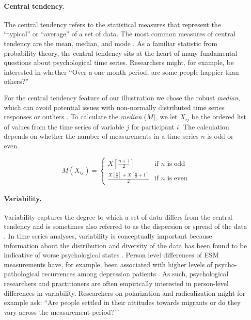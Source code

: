 \paragraph{Central tendency.}

The central tendency refers to the statistical measures that represent
the ``typical'' or ``average'' of a set of data. The most common
measures of central tendency are the mean, median, and mode
\citep{weisberg1992}. As a familiar statistic from probability theory,
the central tendency sits at the heart of many fundamental questions
about psychological time series. Researchers might, for example, be
interested in whether ``Over a one month period, are some people happier
than others?''

For the central tendency feature of our illustration we chose the robust
\textit{median}, which can avoid potential issues with non-normally
distributed time series responses or outliers \citep{weisberg1992}. To
calculate the \textit{median} (\(M\)), we let \(X_{ij}\) be the ordered
list of values from the time series of variable \(j\) for participant
\(i\). The calculation depends on whether the number of measurements in
a time series \(n\) is odd or even.

\begin{equation} \label{eq:median}
  M(X_{ij}) = 
    \begin{cases}
      X \left[ \frac{n+1}{2} \right] & \text{if $n$ is odd} \\
      \frac{X \left[ \frac{n}{2} \right] + X \left[ \frac{n}{2} +1 \right]}{2} & \text{if $n$ is even}
    \end{cases}
\end{equation}

\paragraph{Variability.}

Variability captures the degree to which a set of data differs from the
central tendency and is sometimes also referred to as the dispersion or
spread of the data \citep{weisberg1992}. In time series analyses,
variability is conceptually important because information about the
distribution and diversity of the data has been found to be indicative
of worse psychological states \citep{myin-germeys2018, helmich2021}.
Person level differences of ESM measurements have, for example, been
associated with higher levels of psycho-pathological recurrences among
depression patients \citep{timm2017}. As such, psychological researchers
and practitioners are often empirically interested in person-level
differences in variability. Researchers on polarization and
radicalization might for example ask: ``Are people settled in their
attitudes towards migrants or do they vary across the measurement
period?'\,'


